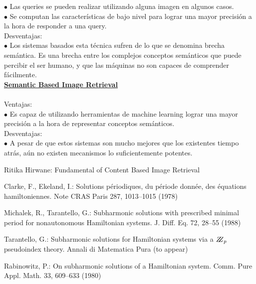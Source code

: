 \documentclass{llncs}
\begin{document}
\noindent$\bullet $ Las queries se pueden realizar utilizando alguna imagen en algunos casos.\\
$\bullet $ Se computan las caracter\'isticas de bajo nivel para lograr una mayor precisi\'on a la hora de responder a una 
query.\\

Desventajas:\\
\noindent$\bullet$ Los sistemas basados esta t\'ecnica sufren de lo que se denomina brecha sem\'antica. Es una brecha 
entre los complejos conceptos sem\'anticos que puede percibir el ser humano, y que las m\'aquinas no son capaces de
comprender f\'acilmente.\\

\underline {\bf Semantic Based Image Retrieval}\\\\

Ventajas:\\
\noindent$\bullet$ Es capaz de utilizando herramientas de machine learning lograr una mayor precisi\'on a la hora de representar conceptos sem\'anticos.\\

Desventajas:\\
$\bullet$ A pesar de que estos sistemas son mucho mejores que los existentes tiempo atr\'as, a\'un no existen mecanismos lo suficientemente potentes.

\newpage
{}
\begin{thebibliography}{}
    Ritika Hirwane:
    Fundamental of Content Based Image
    Retrieval
    
    Clarke, F., Ekeland, I.:
    Solutions p\'{e}riodiques, du
    p\'{e}riode donn\'{e}e, des \'{e}quations hamiltoniennes.
    Note CRAS Paris 287, 1013--1015 (1978)
    
    Michalek, R., Tarantello, G.:
    Subharmonic solutions with prescribed minimal
    period for nonautonomous Hamiltonian systems.
    J. Diff. Eq. 72, 28--55 (1988)
    
    Tarantello, G.:
    Subharmonic solutions for Hamiltonian
    systems via a $\bbbz_{p}$ pseudoindex theory.
    Annali di Matematica Pura (to appear)
    
    Rabinowitz, P.:
    On subharmonic solutions of a Hamiltonian system.
    Comm. Pure Appl. Math. 33, 609--633 (1980)
    
\end{thebibliography}
\end{document}
